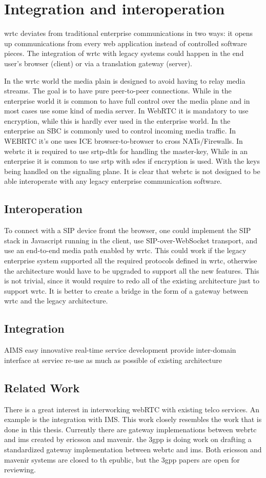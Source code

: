 \section{Integration and interoperation}
\gls{wrtc} deviates from traditional enterprise communications in two ways: it opens up communications from every web application instead of controlled software pieces. The integration of \gls{wrtc} with legacy systems could happen in the end user's browser (client) or via a translation gateway (server).

In the \gls{wrtc} world the media plain is designed to avoid having to relay media streams. The goal is to have pure peer-to-peer connections. While in the enterprise world it is common to have full control over the media plane and in most cases use some kind of media server. In WebRTC it is mandatory to use encryption, while this is hardly ever used in the enterprise world. In the enterprise an SBC is commonly used to control incoming media traffic. In WEBRTC it's one uses ICE browser-to-browser to cross NATs/Firewalls. In webrtc it is required to use srtp-dtls for handling the master-key, While in an enterprise it is common to use srtp with sdes if encryption is used. With the keys being handled on the signaling plane. It is clear that webrtc is not designed to be able interoperate with any legacy enterprise communication software.

\subsection{Interoperation}
To connect with a SIP device fromt the browser, one could implement the SIP stack in Javascript running in the client, use SIP-over-WebSocket transport, and use an end-to-end media path enabled by \gls{wrtc}. This could work if the legacy enterprise system supported all the required protocols defined in \gls{wrtc}, otherwise the architecture would have to be upgraded to support all the new features. This is not trivial, since it would require to redo all of the existing architecture just to support \gls{wrtc}. It is better to create a bridge in the form of a gateway between \gls{wrtc} and the legacy architecture.

\subsection{Integration}
AIMS
easy innovative real-time service development
provide inter-domain interface at serviec
re-use as much as possible of existing architecture


\subsection{Related Work}
There is a great interest in interworking webRTC with existing telco services. An example is the integration with IMS. This work closely resembles the work that is done in this thesis. Currently there are gateway implemenations between webrtc and ims created by ericsson and mavenir. the 3gpp is doing work on drafting a standardized gateway implementation between webrtc and ims. Both ericsson and mavenir systems are closed to th epublic, but the 3gpp papers are open for reviewing.